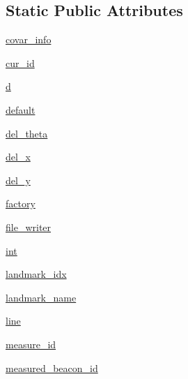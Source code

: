 \subsection*{Static Public Attributes}
\begin{DoxyCompactItemize}
\item
\hyperlink{classfactor__graph_1_1factor__graph_1_1FactorGraphData_a4f294604a7ec76d90f1ef0dd945a94a6}{covar\+\_\+info}
\item
\hyperlink{classfactor__graph_1_1factor__graph_1_1FactorGraphData_aa5c13c65ba3d4a3f09f88fc9a3dd427f}{cur\+\_\+id}
\item
\hyperlink{classfactor__graph_1_1factor__graph_1_1FactorGraphData_acbd4f27881b16f61561b72f0ad5deef0}{d}
\item
\hyperlink{classfactor__graph_1_1factor__graph_1_1FactorGraphData_a063809123abcfe900d4994afc25eb70e}{default}
\item
\hyperlink{classfactor__graph_1_1factor__graph_1_1FactorGraphData_a6321b6397ab73d4adf486a04238fb591}{del\+\_\+theta}
\item
\hyperlink{classfactor__graph_1_1factor__graph_1_1FactorGraphData_a9c9d799afa2c1f0221966fad8b9fd692}{del\+\_\+x}
\item
\hyperlink{classfactor__graph_1_1factor__graph_1_1FactorGraphData_ad5dfa608d846f3234e1d58c34119b5cf}{del\+\_\+y}
\item
\hyperlink{classfactor__graph_1_1factor__graph_1_1FactorGraphData_a12a0c7f8c4843aa8a686587289fd842c}{factory}
\item
\hyperlink{classfactor__graph_1_1factor__graph_1_1FactorGraphData_a2c4164c1477e1e803ed804f0e9509ff9}{file\+\_\+writer}
\item
\hyperlink{classfactor__graph_1_1factor__graph_1_1FactorGraphData_add1eb3776b973e3f3db9b0e15f0c3e39}{int}
\item
\hyperlink{classfactor__graph_1_1factor__graph_1_1FactorGraphData_a4bf536b18a83df11bace4054a3b909ac}{landmark\+\_\+idx}
\item
\hyperlink{classfactor__graph_1_1factor__graph_1_1FactorGraphData_a45350c2f4e85a6cc415008a9666b77be}{landmark\+\_\+name}
\item
\hyperlink{classfactor__graph_1_1factor__graph_1_1FactorGraphData_ad29f39faddbd812ee88d38643b5ec52c}{line}
\item
\hyperlink{classfactor__graph_1_1factor__graph_1_1FactorGraphData_a3405f6e428d0a79fee97e678effc24a7}{measure\+\_\+id}
\item
\hyperlink{classfactor__graph_1_1factor__graph_1_1FactorGraphData_af896053339693a814337ba1bdc0676db}{measured\+\_\+beacon\+\_\+id}

\end{DoxyCompactItemize}
